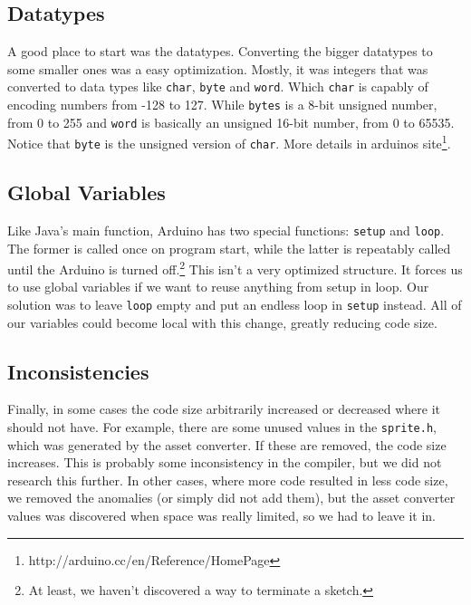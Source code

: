 

\subsection{Datatypes} %
A good place to start was the datatypes. Converting the bigger datatypes to some smaller ones was a easy optimization. Mostly, it was integers that was converted to data types like {\tt char}, {\tt byte} and {\tt word}. Which {\tt char} is capably of encoding numbers from -128 to 127. While {\tt bytes} is a 8-bit unsigned number, from 0 to 255 and {\tt word} is basically an unsigned 16-bit number, from 0 to 65535. Notice that {\tt byte} is the unsigned version of {\tt char}. More details in arduinos site\footnote{http://arduino.cc/en/Reference/HomePage}.

\subsection{Global Variables} %
Like Java's main function, Arduino has two special functions: {\tt setup} and {\tt loop}. The former is called once on program start, while the latter is repeatably called until the Arduino is turned off.\footnote{At least, we haven't discovered a way to terminate a sketch.} This isn't a very optimized structure. It forces us to use global variables if we want to reuse anything from setup in loop. Our solution was to leave {\tt loop} empty and put an endless loop in {\tt setup} instead. All of our variables could become local with this change, greatly reducing code size.

\subsection{Inconsistencies} %
Finally, in some cases the code size arbitrarily increased or decreased where it should not have. For example, there are some unused values in the {\tt sprite.h}, which was generated by the asset converter. If these are removed, the code size increases. This is probably some inconsistency in the compiler, but we did not research this further. In other cases, where more code resulted in less code size, we removed the anomalies (or simply did not add them), but the asset converter values was discovered when space was really limited, so we had to leave it in.
